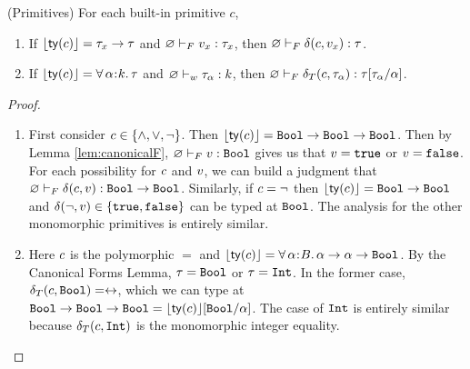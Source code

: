 \begin{fullversion}
\begin{lemma}\label{lem:primitivesF}(Primitives) 
For each built-in primitive $c$, 
%
\begin{enumerate} 
\item If $\lfloor{{\mathsf{ty}}(\ensuremath{c})}\rfloor = \tau_x \rightarrow \tau$
    and ${\varnothing} \vdash_F {v_x} : {\tau_x}$, 
    then %
    ${\varnothing} \vdash_F {\delta(c,v_x)} : {\tau}$.
\item If $\lfloor{{\mathsf{ty}}(\ensuremath{c})}\rfloor = \forall\, \alpha\hspace{0.05em}{:}\hspace{0.05em} k.\, \tau$ 
    and ${\varnothing} \vdash_w {\tau_\alpha} : {k}$, 
    then %
    ${\varnothing} \vdash_F {\delta_T(c,\tau_\alpha)} : {{\tau}[\tau_\alpha/\alpha]}$.
    \end{enumerate}
\end{lemma}
\begin{proof}
  \begin{enumerate}
      \item First consider $c \in \{\wedge, \vee, \neg\}$. 
          Then $\lfloor{{\mathsf{ty}}(\ensuremath{c})}\rfloor = \texttt{Bool} \rightarrow \texttt{Bool} \rightarrow \texttt{Bool}$.
          Then by Lemma \ref{lem:canonicalF}, ${\varnothing} \vdash_F {v} : {\texttt{Bool}}$
          gives us that $v = \mathtt{true}$ or $v = \mathtt{false}$.
          For each possibility for $c$ and $v$, we can build a judgment 
          that ${\varnothing} \vdash_F {\delta(c,v)} : {\texttt{Bool} \rightarrow \texttt{Bool}}$.
          Similarly, if $c = \neg$ 
          then $\lfloor{{\mathsf{ty}}(\ensuremath{c})}\rfloor = \texttt{Bool} \rightarrow \texttt{Bool}$ and 
          $\delta(\neg,v) \in \{\mathtt{true},\mathtt{false}\}$ can be typed at $\texttt{Bool}$.
          The analysis for the other monomorphic primitives is entirely similar.
      \item Here $c$ is the polymorphic $=$ and 
          $\lfloor{{\mathsf{ty}}(\ensuremath{c})}\rfloor = \forall\, \alpha\hspace{0.05em}{:}\hspace{0.05em} B.\, \alpha \rightarrow \alpha \rightarrow \texttt{Bool}$. By the Canonical Forms Lemma, 
          $\tau = \texttt{Bool}$ or $\tau = \texttt{Int}$. In the former case,
          $\delta_T(c,\texttt{Bool}) = \leftrightarrow$, which we can type at 
          $\texttt{Bool} \rightarrow \texttt{Bool} \rightarrow \texttt{Bool} ={\lfloor{{\mathsf{ty}}(\ensuremath{c})}\rfloor}[\texttt{Bool}/\alpha]$. The case of $\texttt{Int}$ is entirely similar
          because $\delta_T(c,\texttt{Int})$ is the monomorphic integer equality.
  \end{enumerate}
  \end{proof}


\end{fullversion}

